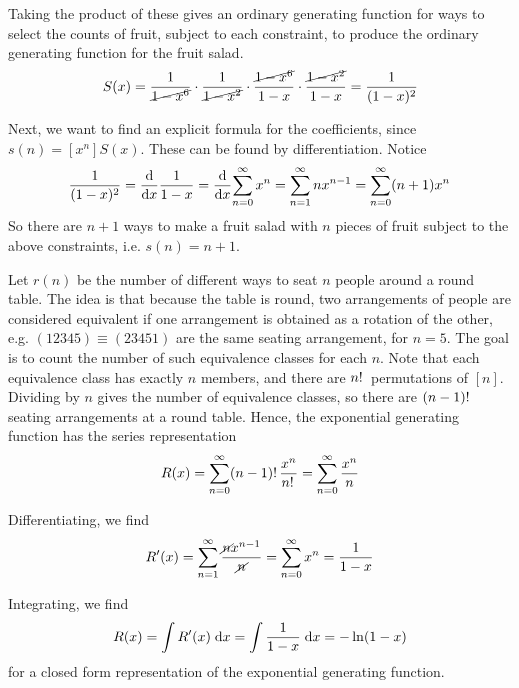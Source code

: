 \documentclass[11pt]{article}
\begin{document}
Taking the product of these gives an ordinary generating function for ways to
select the counts of fruit, subject to each constraint, to produce the ordinary
generating function for the fruit salad.
%
\begin{equation*}
    S(x)
    =
    \frac{1}{\cancel{1 - x^6}}
    \cdot \frac{1}{\cancel{1 - x^2}}
    \cdot \frac{\cancel{1 - x^6}}{1 - x}
    \cdot \frac{\cancel{1 - x^2}}{1 - x}
    = \frac{1}{(1-x)^2}
\end{equation*}

Next, we want to find an explicit formula for the coefficients,
since $s(n) = [x^n]S(x)$. These can be found by differentiation.
%
Notice
%
\begin{equation*}
    \frac{1}{(1-x)^2}
    = \frac{\mathrm{d} }{\mathrm{d} x} { \frac{1}{1-x} }
    = \frac{\mathrm{d} }{\mathrm{d} x} { \sum^\infty_{n=0} x^n }
    = \sum^\infty_{n=1} n x^{n-1}
    = \sum^\infty_{n=0} (n + 1) x^n
\end{equation*}
%
So there are $n + 1$ ways to make a fruit salad with $n$ pieces of fruit
subject to the above constraints, i.e. $s(n) = n + 1$.


Let $r(n)$ be the number of different ways to seat $n$ people around a round
table. The idea is that because the table is round, two arrangements of people
are considered equivalent if one arrangement is obtained as a rotation of the
other, e.g. $(12345) \equiv (23451)$ are the same seating arrangement, for
$n=5$. The goal is to count the number of such equivalence classes for each
$n$.
%
Note that each equivalence class has exactly $n$ members, and there are
$n!\,$ permutations of $[n]$. Dividing by $n$ gives the number of equivalence
classes, so there are $(n-1)!\,$ seating arrangements at a round table.
%
Hence, the exponential generating function has the series representation
%
\begin{equation*}
    R(x)
    = \sum^\infty_{n=0} (n-1)!\, \frac{x^n}{n!\,}
    = \sum^\infty_{n=0} \frac{x^n}{n}
\end{equation*}

Differentiating, we find
%
\begin{equation*}
    R^\prime(x)
    = \sum^\infty_{n=1} \frac{\cancel{n} x^{n-1}}{\cancel{n}}
    = \sum^\infty_{n=0} x^n
    = \frac{1}{1-x}
\end{equation*}

Integrating, we find
%
\begin{equation*}
    R(x) = \int R^\prime(x) \;\mathrm{d} x
    = \int \frac{1}{1-x} \;\mathrm{d} x
    = - \ln (1-x)
\end{equation*}
%
for a closed form representation of the exponential generating function.
\end{document}
